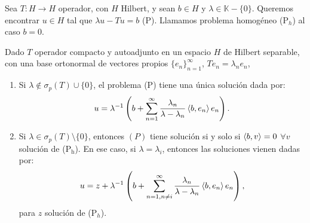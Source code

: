\begin{definition}
  Sea $T:H\to H$ operador, con $H$ Hilbert, y sean $b\in H$ y $\lambda\in
  \mathbb{K}-\{0\} $. Queremos encontrar $u\in H$ tal que $\lambda u-Tu=b$ (P).
  Llamamos problema homogéneo (P$_h$) al caso $b=0$.
\end{definition}

\begin{theorem}
  \label{th:fredholm}
  Dado $T$ operador compacto y autoadjunto en un espacio $H$ de Hilbert
  separable, con una base ortonormal de vectores propios $\{e_n\}_{n=1}^\infty$,
  $Te_n = \lambda_n e_n$,
  \begin{enumerate}
    \item Si $\lambda\not\in \sigma_p(T) \cup \{0\} $, el problema (P) tiene una
      única solución dada por:
       \[
      u=\lambda^{-1}\left( b+ \sum_{n=1}^{\infty}
      \frac{\lambda_n}{\lambda-\lambda_n}\left\langle b,e_n\right\rangle e_n \right) 
      .\] 
    \item Si $\lambda \in \sigma_p(T)\setminus \{0\}$, entonces $(P)$ tiene
      solución si y solo si  $\left\langle b,v\right\rangle=0$ $\forall v$ solución de
      (P$_{\text{h}}$). En ese caso, si $\lambda=\lambda_i$, entonces las
      soluciones vienen dadas por:
       \[
      u=z+\lambda^{-1}\left(b+ \sum_{n=1,n\neq i}^{\infty}
      \frac{\lambda_n}{\lambda-\lambda_n}\left\langle b,e_n\right\rangle e_n \right) 
      ,\] 
      para $z$ solución de (P$_h$).
  \end{enumerate}
\end{theorem}

